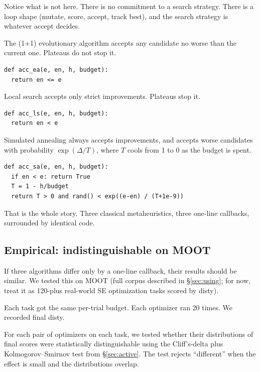 \documentclass[AMA,STIX2COL]{WileyNJDv5}
\begin{document}
Notice what is not here. There is no commitment to a search
strategy. There is a loop shape (mutate, score, accept, track
best), and the search strategy is whatever \textsf{accept}
decides.

The (1+1) evolutionary algorithm accepts any candidate no worse
than the current one. Plateaus do not stop it.

\begin{verbatim}
def acc_ea(e, en, h, budget):
  return en <= e
\end{verbatim}

Local search accepts only strict improvements. Plateaus stop it.

\begin{verbatim}
def acc_ls(e, en, h, budget):
  return en < e
\end{verbatim}

Simulated annealing always accepts improvements, and accepts
worse candidates with probability $\exp(\Delta/T)$, where $T$
cools from 1 to 0 as the budget is spent.

\begin{verbatim}
def acc_sa(e, en, h, budget):
  if en < e: return True
  T = 1 - h/budget
  return T > 0 and rand() < exp((e-en) / (T+1e-9))
\end{verbatim}

That is the whole story. Three classical metaheuristics, three
one-line callbacks, surrounded by identical code.

\subsection{Empirical: indistinguishable on MOOT}

If three algorithms differ only by a one-line callback, their
results should be similar. We tested this on MOOT (full corpus
described in \S\ref{sec:using}; for now, treat it as 120-plus
real-world SE optimization tasks scored by \textsf{disty}).

Each task got the same per-trial budget. Each optimizer ran 20
times. We recorded final \textsf{disty}.

For each pair of optimizers on each task, we tested whether
their distributions of final scores were statistically
distinguishable using the Cliff's-delta plus Kolmogorov--Smirnov
test from \S\ref{sec:active}. The test rejects ``different''
when the effect is small and the distributions overlap.

\end{document}
